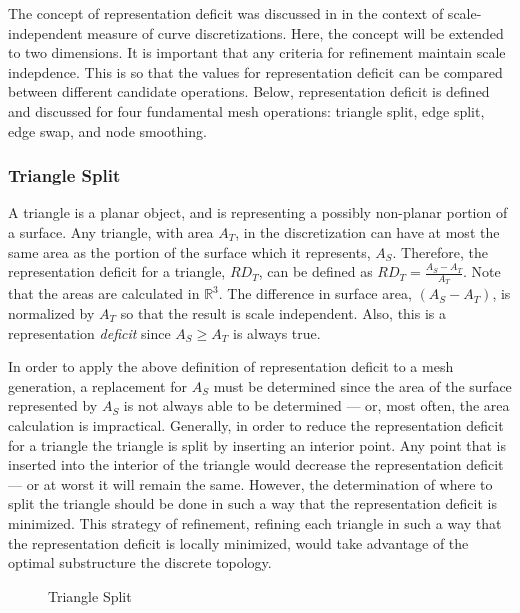 The concept of representation deficit was discussed in \cite{mclaurin13}
in the context of scale-independent measure of curve discretizations.
Here, the concept will be extended to two dimensions. It is important
that any criteria for refinement maintain scale indepdence. This is so
that the values for representation deficit can be compared between
different candidate operations. Below, representation deficit is defined
and discussed for four fundamental mesh operations: triangle split, edge
split, edge swap, and node smoothing.

\subsubsection{Triangle Split}
A triangle is a planar object, and is representing a possibly non-planar
portion of a surface. Any triangle, with area $A_T$, in the
discretization can have at most the same area as the portion of the
surface which it represents, $A_S$. Therefore, the representation
deficit for a triangle, $RD_T$, can be defined as $RD_T = \frac{A_S -
A_T}{A_T}$. Note that the areas are calculated in ${\mathbb R}^3$. The
difference in surface area, $\left(A_S - A_T\right)$, is normalized by
$A_T$ so that the result is scale independent. Also, this is a
representation {\it deficit} since $A_S \ge A_T$ is always true.

In order to apply the above definition of representation deficit to a
mesh generation, a replacement for $A_S$ must be determined since the
area of the surface represented by $A_S$ is not always able to be
determined --- or, most often, the area calculation is impractical.
Generally, in order to reduce the representation deficit for a triangle
the triangle is split by inserting an interior point. Any point that is
inserted into the interior of the triangle would decrease the
representation deficit --- or at worst it will remain the same. However,
the determination of where to split the triangle should be done in such
a way that the representation deficit is minimized. This strategy of
refinement, refining each triangle in such a way that the representation
deficit is locally minimized, would take advantage of the optimal
substructure the discrete topology.

\begin{figure}[h!]
  \caption{Triangle Split}
\end{figure}

